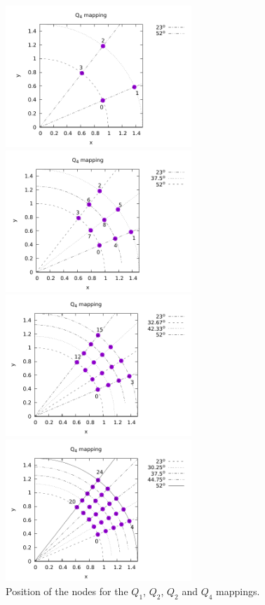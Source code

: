 \begin{center}
\includegraphics[width=7cm]{images/mappings/curved/nodesQ1.pdf}
\includegraphics[width=7cm]{images/mappings/curved/nodesQ2.pdf}\\
\includegraphics[width=7cm]{images/mappings/curved/nodesQ3.pdf}
\includegraphics[width=7cm]{images/mappings/curved/nodesQ4.pdf}\\
{\captionfont Position of the nodes for the $Q_1$, $Q_2$, $Q_2$ and $Q_4$ mappings.}
\end{center}

